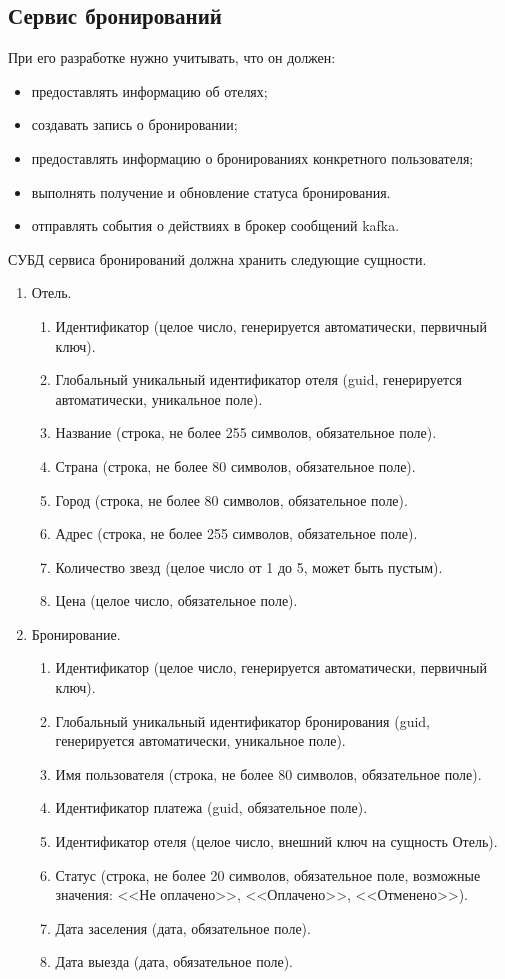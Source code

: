 \subsection{Сервис бронирований}
При его разработке нужно учитывать, что он должен:
\begin{itemize}
	\item предоставлять информацию об отелях;
	\item создавать запись о бронировании;
	\item предоставлять информацию о бронированиях конкретного пользователя;
	\item выполнять получение и обновление статуса бронирования.
	\item отправлять события о действиях в брокер сообщений kafka.
\end{itemize}
СУБД сервиса бронирований должна хранить следующие сущности.
\begin{enumerate}
	\item Отель.
	\begin{enumerate}
		\item Идентификатор (целое число, генерируется автоматически, первичный ключ).
		\item Глобальный уникальный идентификатор отеля (guid, генерируется автоматически, уникальное поле).
		\item Название (строка, не более 255 символов, обязательное поле).
		\item Страна (строка, не более 80 символов, обязательное поле).
		\item Город (строка, не более 80 символов, обязательное поле).
		\item Адрес (строка, не более 255 символов, обязательное поле).
		\item Количество звезд (целое число от 1 до 5, может быть пустым).
		\item Цена (целое число, обязательное поле).
	\end{enumerate}
	\item Бронирование.
	\begin{enumerate}
		\item Идентификатор (целое число, генерируется автоматически, первичный ключ).
		\item Глобальный уникальный идентификатор бронирования (guid, генерируется автоматически, уникальное поле).
		\item Имя пользователя (строка, не более 80 символов, обязательное поле).
		\item Идентификатор платежа (guid, обязательное поле).
		\item Идентификатор отеля (целое число, внешний ключ на сущность Отель).
		\item Статус (строка, не более 20 символов, обязательное поле, возможные значения: <<Не оплачено>>, <<Оплачено>>, <<Отменено>>).
		\item Дата заселения (дата, обязательное поле).
		\item Дата выезда (дата, обязательное поле).
	\end{enumerate}
\end{enumerate}

